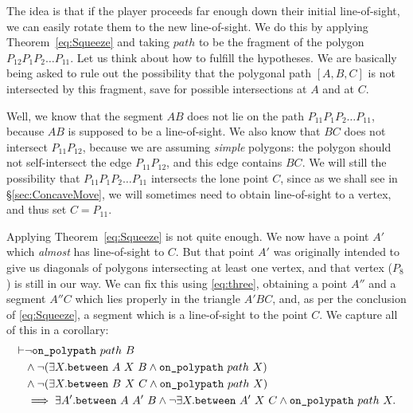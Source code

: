 The idea is that if the player proceeds far enough down their initial line-of-sight, we can easily rotate them to the new line-of-sight. We do this by applying Theorem~\ref{eq:Squeeze} and taking $path$ to be the fragment of the polygon $P_{12}P_1P_2\ldots P_{11}$. Let us think about how to fulfill the hypotheses. We are basically being asked to rule out the possibility that the polygonal path $[A,B,C]$ is not intersected by this fragment, save for possible intersections at $A$ and at $C$. 

Well, we know that the segment $AB$ does not lie on the path $P_{11}P_1P_2\ldots P_{11}$, because $AB$ is supposed to be a line-of-sight. We also know that $BC$ does not intersect $P_{11}P_{12}$, because we are assuming \emph{simple} polygons: the polygon should not self-intersect the edge $P_{11}P_{12}$, and this edge contains $BC$. We will still the possibility that $P_{11}P_1P_2\ldots P_{11}$ intersects the lone point $C$, since as we shall see in \S\ref{sec:ConcaveMove}, we will sometimes need to obtain line-of-sight to a vertex, and thus set $C=P_{11}$.

Applying Theorem~\ref{eq:Squeeze} is not quite enough. We now have a point $A'$ which \emph{almost} has line-of-sight to $C$. But that point $A'$ was originally intended to give us diagonals of polygons intersecting at least one vertex, and that vertex ($P_8$) is still in our way. We can fix this using \ref{eq:three}, obtaining a point $A''$ and a segment $A''C$ which lies properly in the triangle $A'BC$, and, as per the conclusion of \eqref{eq:Squeeze}, a segment which is a line-of-sight to the point $C$. We capture all of this in a corollary:
\begin{equation}\label{eq:Squeeze2}
  \begin{aligned}
\vdash    &\neg\texttt{on\_polypath}\ path\ B\\
    &\wedge \neg(\exists X. \texttt{between}\ A\ X\ B \wedge \texttt{on\_polypath}\ path\ X)\\
    &\wedge \neg(\exists X. \texttt{between}\ B\ X\ C \wedge \texttt{on\_polypath}\ path\ X)\\
    &\implies \exists A'. \texttt{between}\ A\ A'\ B \wedge \neg\exists X. \texttt{between}\ A'\ X\ C \wedge \texttt{on\_polypath}\ path\ X.
  \end{aligned}
\end{equation}

